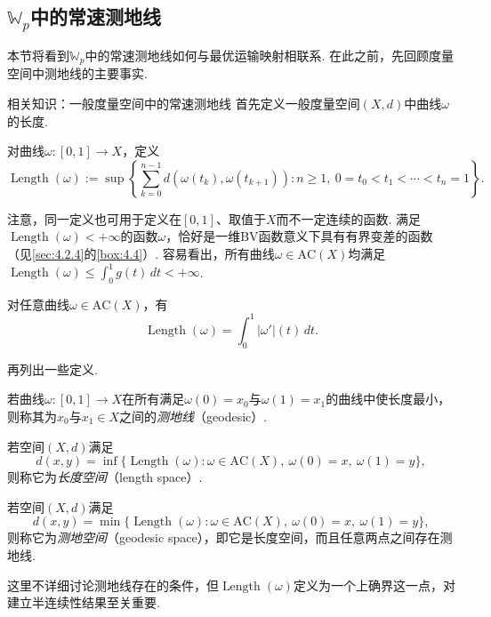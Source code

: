 \subsection[Wasserstein空间中的常速测地线]{$\mathbb W_p$中的常速测地线}\label{sec:5.4}

本节将看到$\mathbb W_p$中的常速测地线如何与最优运输映射相联系. 在此之前，先回顾度量空间中测地线的主要事实.

\begin{sourcebox}{相关知识：一般度量空间中的常速测地线}\label{box:5.2}
首先定义一般度量空间$(X,d)$中曲线$\omega$的长度.
\begin{definition*}
对曲线$\omega:[0,1]\to X$，定义
\[
\operatorname{Length}(\omega):=\sup\left\{\sum_{k=0}^{n-1}d(\omega(t_k),\omega(t_{k+1})):
n\ge1,\ 0=t_0<t_1<\cdots<t_n=1\right\}.
\]
\end{definition*}
注意，同一定义也可用于定义在$[0,1]$、取值于$X$而不一定连续的函数. 满足$\operatorname{Length}(\omega)<+\infty$的函数$\omega$，恰好是一维BV函数意义下具有有界变差的函数（见\autoref{sec:4.2.4}的\autoref{box:4.4}）. 容易看出，所有曲线$\omega\in\mathrm{AC}(X)$均满足$\operatorname{Length}(\omega)\le\int_0^1g(t)\,dt<+\infty$.
\begin{proposition*}
对任意曲线$\omega\in\mathrm{AC}(X)$，有
\[
\operatorname{Length}(\omega)=\int_0^1|\omega'|(t)\,dt.
\]
\end{proposition*}
再列出一些定义.
\begin{definition*}
若曲线$\omega:[0,1]\to X$在所有满足$\omega(0)=x_0$与$\omega(1)=x_1$的曲线中使长度最小，则称其为$x_0$与$x_1\in X$之间的\emph{测地线}（geodesic）.

若空间$(X,d)$满足
\[
d(x,y)=\inf\{\operatorname{Length}(\omega):\omega\in\mathrm{AC}(X),\ \omega(0)=x,\ \omega(1)=y\},
\]
则称它为\emph{长度空间}（length space）.

若空间$(X,d)$满足
\[
d(x,y)=\min\{\operatorname{Length}(\omega):\omega\in\mathrm{AC}(X),\ \omega(0)=x,\ \omega(1)=y\},
\]
则称它为\emph{测地空间}（geodesic space），即它是长度空间，而且任意两点之间存在测地线.
\end{definition*}
这里不详细讨论测地线存在的条件，但$\operatorname{Length}(\omega)$定义为一个上确界这一点，对建立半连续性结果至关重要.


\end{sourcebox}
